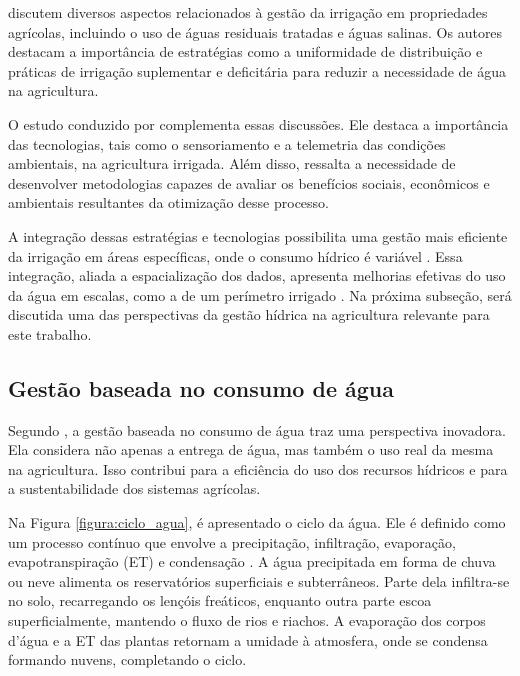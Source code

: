 \textcite{Pereira_irrigation2002} discutem diversos aspectos relacionados à gestão da irrigação em propriedades agrícolas, incluindo o uso de águas residuais tratadas e águas salinas. Os autores destacam a importância de estratégias como a uniformidade de distribuição e práticas de irrigação suplementar e deficitária para reduzir a necessidade de água na agricultura.

O estudo conduzido por \textcite{Burton_irrigation2010} complementa essas discussões. Ele destaca a importância das tecnologias, tais como o sensoriamento e a telemetria das condições ambientais, na agricultura irrigada. Além disso, ressalta a necessidade de desenvolver metodologias capazes de avaliar os benefícios sociais, econômicos e ambientais resultantes da otimização desse processo.

A integração dessas estratégias e tecnologias possibilita uma gestão mais eficiente da irrigação em áreas específicas, onde o consumo hídrico é variável \parencite{carmody_fao2023}. Essa integração, aliada a espacialização dos dados, apresenta melhorias efetivas do uso da água em escalas, como a de um perímetro irrigado \parencite{Burton_irrigation2010, Ramos_irrigacao2022}. Na próxima subseção, será discutida uma das perspectivas da gestão hídrica na agricultura relevante para este trabalho.

\subsection{Gestão baseada no consumo de água}

Segundo \textcite{carmody_fao2023}, a gestão baseada no consumo de água traz uma perspectiva inovadora. Ela considera não apenas a entrega de água, mas também o uso real da mesma na agricultura. Isso contribui para a eficiência do uso dos recursos hídricos e para a sustentabilidade dos sistemas agrícolas. 

Na Figura \ref{figura:ciclo_agua}, é apresentado o ciclo da água. Ele é definido como um processo contínuo que envolve a precipitação, infiltração, evaporação, evapotranspiração (ET) e condensação \parencite{carmody_fao2023}. A água precipitada em forma de chuva ou neve alimenta os reservatórios superficiais e subterrâneos. Parte dela infiltra-se no solo, recarregando os lençóis freáticos, enquanto outra parte escoa superficialmente, mantendo o fluxo de rios e riachos. A evaporação dos corpos d'água e a ET das plantas retornam a umidade à atmosfera, onde se condensa formando nuvens, completando o ciclo.

